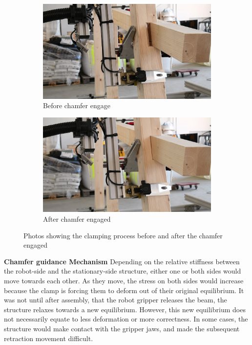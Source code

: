 \begin{figure}
    \centering
    \begin{subfigure}[b]{0.49\textwidth}
        \centering
        \includegraphics[width=\textwidth]{images/05/image49.jpg}
        \caption{Before chamfer engage}
    \end{subfigure}
    \hfill
    \begin{subfigure}[b]{0.49\textwidth}
        \centering
        \includegraphics[width=\textwidth]{images/05/image13.jpg}
        \caption{After chamfer engaged}
    \end{subfigure}
    \caption{Photos showing the clamping process before and after the chamfer engaged}
    \label{fig:chamfer-engage}
\end{figure}

\textbf{Chamfer guidance Mechanism} Depending on the relative stiffness between the robot-side and the stationary-side structure, either one or both sides would move towards each other. As they move, the stress on both sides would increase because the clamp is forcing them to deform out of their original equilibrium. It was not until after assembly, that the robot gripper releases the beam, the structure relaxes towards a new equilibrium. However, this new equilibrium does not necessarily equate to less deformation or more correctness. In some cases, the structure would make contact with the gripper jaws, and made the subsequent retraction movement difficult. 

